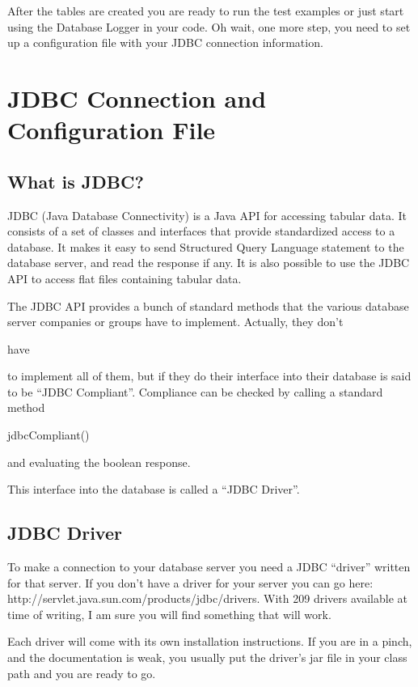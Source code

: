 \documentclass[11pt]{report}
\begin{document}
\begin{flushleft}
    After the tables are created you are ready to run the test examples or
    just start using the Database Logger in your code.  Oh wait, one more
    step, you need to set up a configuration file with your JDBC connection
    information.  

\chapter{JDBC Connection and Configuration File}
    \section{What is JDBC?}
        JDBC (Java Database Connectivity) is a Java API for accessing tabular
        data.  It consists of a set of classes and interfaces that provide
        standardized access to a database.  It makes it easy to send
        Structured Query Language statement to the database server, and read
        the response if any.  It is also possible to use the JDBC API to
        access flat files containing tabular data.

        The JDBC API provides a bunch of standard methods that the various
        database server companies or groups have to implement.  Actually,
        they don't \begin{emph}have\end{emph} to implement all of them, but if
        they do their interface into their database is said to be ``JDBC
        Compliant''.  Compliance can be checked by calling a standard method
        \begin{slshape}jdbcCompliant()\end{slshape} and evaluating the boolean
        response.  
        
        This interface into the database is called a ``JDBC Driver''.

    \section{JDBC Driver}
        To make a connection to your database server you need a JDBC
        ``driver'' written for that server.  If you don't have a driver for
        your server you can go here:
        http://servlet.java.sun.com/products/jdbc/drivers. With 209 drivers
        available at time of writing, I am sure you will find something that
        will work.

        Each driver will come with its own installation instructions.  If you
        are in a pinch, and the documentation is weak, you usually put the
        driver's jar file in your class path and you are ready to go.  


\end{flushleft}
\end{document}
